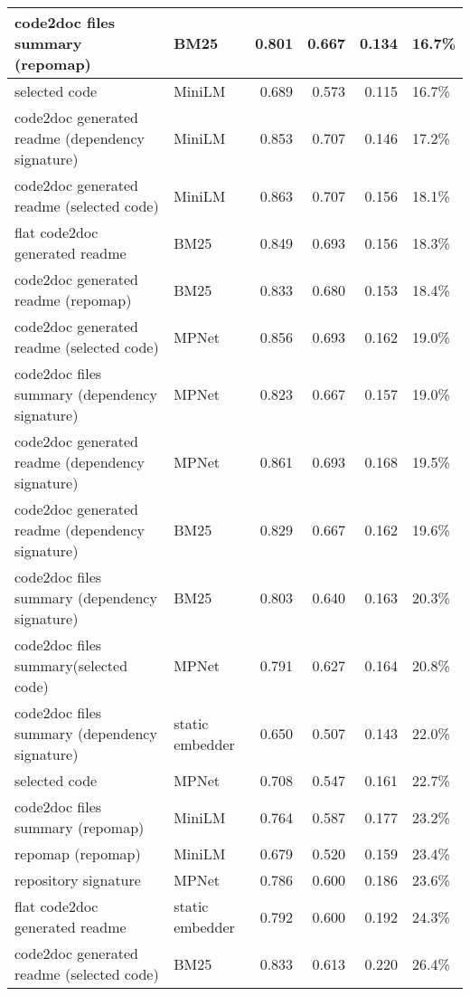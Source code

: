 \begin{tabular}{||l|l|r|r|r|l||}
{\color{cyan} code2doc files summary (repomap)} & BM25 & 0.801 & 0.667 & 0.134 & 16.7\% \\
\hline
selected code & MiniLM & 0.689 & 0.573 & 0.115 & 16.7\% \\
\hline
{\color{blue} code2doc generated readme (dependency signature)} & MiniLM & 0.853 & 0.707 & 0.146 & 17.2\% \\
\hline
{\color{green} code2doc generated readme (selected code)} & MiniLM & 0.863 & 0.707 & 0.156 & 18.1\% \\
\hline
{\color{green} flat code2doc generated readme} & BM25 & 0.849 & 0.693 & 0.156 & 18.3\% \\
\hline
{\color{cyan} code2doc generated readme (repomap)} & BM25 & 0.833 & 0.680 & 0.153 & 18.4\% \\
\hline
{\color{green} code2doc generated readme (selected code)} & MPNet & 0.856 & 0.693 & 0.162 & 19.0\% \\
\hline
{\color{blue} code2doc files summary (dependency signature)} & MPNet & 0.823 & 0.667 & 0.157 & 19.0\% \\
\hline
{\color{blue} code2doc generated readme (dependency signature)} & MPNet & 0.861 & 0.693 & 0.168 & 19.5\% \\
\hline
{\color{blue} code2doc generated readme (dependency signature)} & BM25 & 0.829 & 0.667 & 0.162 & 19.6\% \\
\hline
{\color{blue} code2doc files summary (dependency signature)} & BM25 & 0.803 & 0.640 & 0.163 & 20.3\% \\
\hline
{\color{green} code2doc files summary(selected code)} & MPNet & 0.791 & 0.627 & 0.164 & 20.8\% \\
\hline
{\color{blue} code2doc files summary (dependency signature)} & static embedder & 0.650 & 0.507 & 0.143 & 22.0\% \\
\hline
selected code & MPNet & 0.708 & 0.547 & 0.161 & 22.7\% \\
\hline
{\color{cyan} code2doc files summary (repomap)} & MiniLM & 0.764 & 0.587 & 0.177 & 23.2\% \\
\hline
{\color{cyan} repomap (repomap)} & MiniLM & 0.679 & 0.520 & 0.159 & 23.4\% \\
\hline
{\color{red} repository signature} & MPNet & 0.786 & 0.600 & 0.186 & 23.6\% \\
\hline
{\color{green} flat code2doc generated readme} & static embedder & 0.792 & 0.600 & 0.192 & 24.3\% \\
\hline
{\color{green} code2doc generated readme (selected code)} & BM25 & 0.833 & 0.613 & 0.220 & 26.4\% \\

\end{tabular}
